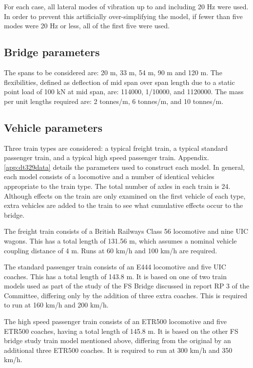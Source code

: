 \begin{appendices}
For each case, all lateral modes of vibration up to and including 20 Hz were used. In order to prevent this artificially over-simplifying the model, if fewer than five modes were 20 Hz or less, all of the first five were used.

\subsection{Bridge parameters}

The spans to be considered are: 20 m, 33 m, 54 m, 90 m and 120 m. The flexibilities, defined as deflection of mid span over span length due to a static point load of 100 kN at mid span, are: 114000, 1/10000, and 1120000. The mass per unit lengths required are: 2 tonnes/m, 6 tonnes/m, and 10 tonnes/m.

\subsection{Vehicle parameters}
Three train types are considered: a typical freight train, a typical standard passenger train, and a typical high speed passenger train. Appendix.\ref{app:dt329data} details the parameters used to construct each model. In general, each model consists of a locomotive and a number of identical vehicles appropriate to the train type. The total number of axles in each train is 24. Although effects on the train are only examined on the first vehicle of each type, extra vehicles are added to the train to see what cumulative effects occur to the bridge.

The freight train consists of a British Railways Class 56 locomotive and nine UIC wagons. This has a total length of 131.56 m, which assumes a nominal vehicle coupling distance of 4 m. Runs at 60 km/h and 100 km/h are required.

The standard passenger train consists of an E444 locomotive and five UIC coaches. This has a total length of 143.8 m. It is based on one of two train models used as part of the study of the FS Bridge discussed in report RP 3 of the Committee, differing only by the addition of three extra coaches. This is required to run at 160 km/h and 200 km/h.

The high speed passenger train consists of an ETR500 locomotive and five ETR500 coaches, having a total length of 145.8 m. It is based on the other FS bridge study train model mentioned above, differing from the original by an additional three ETR500 coaches. It is required to run at 300 km/h and 350 km/h.


\end{appendices}

